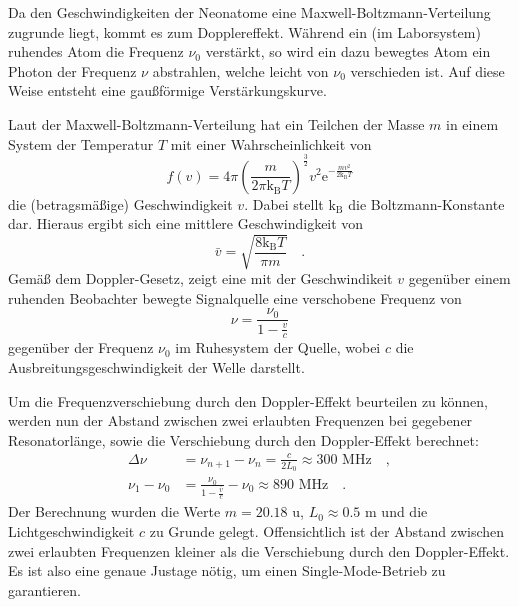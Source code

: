Da den Geschwindigkeiten der Neonatome eine Maxwell-Boltzmann-Verteilung
zugrunde liegt, kommt es zum Dopplereffekt. Während ein (im Laborsystem)
ruhendes Atom die Frequenz $\nu_0$ verstärkt, so wird ein dazu bewegtes
Atom ein Photon der Frequenz $\nu$ abstrahlen, welche leicht von $\nu_0$
verschieden ist. Auf diese Weise entsteht eine gaußförmige Verstärkungskurve.

Laut der Maxwell-Boltzmann-Verteilung hat ein Teilchen der Masse $m$ in einem 
System der Temperatur $T$ mit einer Wahrscheinlichkeit von
\begin{equation}
f(v)=4\pi \left( \frac{m}{2\pi \text{k}_\text{B} T} \right)^\frac{3}{2} v^2 
\text{e}^{-\frac{mv^2}{2\text{k}_\text{B}T}}
\end{equation}
die (betragsmäßige) Geschwindigkeit $v$. Dabei stellt $\text{k}_\text{B}$ die 
Boltzmann-Konstante dar. Hieraus ergibt sich eine mittlere Geschwindigkeit von 
\begin{equation}
\bar{v}=\sqrt{\frac{8\text{k}_\text{B}T}{\pi m}} \quad .
\end{equation}
Gemäß dem Doppler-Gesetz, zeigt eine mit der Geschwindikeit $v$ gegenüber einem 
ruhenden Beobachter bewegte Signalquelle eine verschobene Frequenz von 
\begin{equation}
\nu = \frac{\nu_0}{1-\frac{v}{c}}
\end{equation}
gegenüber der Frequenz $\nu_0$ im Ruhesystem der Quelle, wobei $c$ die 
Ausbreitungsgeschwindigkeit der Welle darstellt.


Um die Frequenzverschiebung durch den Doppler-Effekt beurteilen zu können, werden 
nun der Abstand zwischen zwei erlaubten Frequenzen bei gegebener Resonatorlänge,
sowie die Verschiebung durch den Doppler-Effekt berechnet:
\begin{align}
\Delta \nu &= \nu_{n+1}-\nu_n=\frac{c}{2 L_0} \approx 300\text{ MHz} \quad , \\
\nu _1 -\nu_0&=  \frac{\nu_0}{1-\frac{\bar{v}}{c}}-\nu_0 \approx 890 \text{ MHz} \quad .
\end{align}
Der Berechnung wurden die Werte $m=20.18 \text{ u}$, $L_0\approx 0.5 \text{ m}$ und  
die Lichtgeschwindigkeit $c$ zu Grunde gelegt. Offensichtlich ist der Abstand 
zwischen zwei erlaubten Frequenzen kleiner als die Verschiebung durch den 
Doppler-Effekt. Es ist also eine genaue Justage nötig, um einen Single-Mode-Betrieb zu garantieren.
